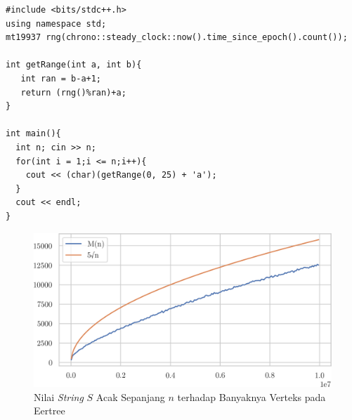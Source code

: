 \documentclass[11pt, a4paper, final]{article}
\begin{document}
\begin{code}
\label{code:string-gen-code}
\begin{verbatim}
#include <bits/stdc++.h>
using namespace std;
mt19937 rng(chrono::steady_clock::now().time_since_epoch().count());

int getRange(int a, int b){
   int ran = b-a+1;
   return (rng()%ran)+a;
}

int main(){
  int n; cin >> n;
  for(int i = 1;i <= n;i++){
    cout << (char)(getRange(0, 25) + 'a'); 
  }
  cout << endl;
}
\end{verbatim}
\end{code}

\begin{figure}[H]
\centering
\includegraphics[scale=1]{assets/memory2.png}
\caption{Nilai \textit{String} $S$ Acak Sepanjang $n$ terhadap Banyaknya Verteks pada Eertree}
\end{figure}
\end{document}
